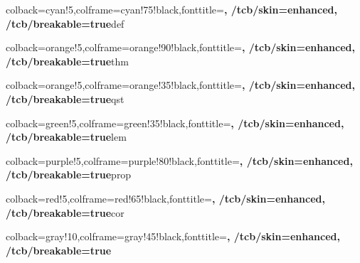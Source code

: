 \usepackage{graphicx}
\graphicspath{{images/}}

\usepackage{float}
\usepackage{titling}
\usepackage{caption}
\usepackage{subcaption}
\usepackage[toc,page]{appendix}
\usepackage[nottoc,notlot,notlof]{tocbibind}
\usepackage{tikz}
\usepackage{cite}



\usepackage{tcolorbox}


\theoremstyle{definition}
\newtheorem{defin}{Definition}[section]
%
{colback=cyan!5,colframe=cyan!75!black,fonttitle=\bfseries, /tcb/skin=enhanced, /tcb/breakable=true}{def}

\newtheorem{theorem}{Theorem}[section]
%
{colback=orange!5,colframe=orange!90!black,fonttitle=\bfseries, /tcb/skin=enhanced, /tcb/breakable=true}{thm}

\newtheorem{quest}{Question}[section]
%
{colback=orange!5,colframe=orange!35!black,fonttitle=\bfseries, /tcb/skin=enhanced, /tcb/breakable=true}{qst}

\newtheorem{lemma}{Lemma}[section]
%
{colback=green!5,colframe=green!35!black,fonttitle=\bfseries, /tcb/skin=enhanced, /tcb/breakable=true}{lem}

\newtheorem{prop}{Proposition}[section]
%
{colback=purple!5,colframe=purple!80!black,fonttitle=\bfseries, /tcb/skin=enhanced, /tcb/breakable=true}{prop}

\newtheorem{corollary}{Corollary}[theorem]
%
{colback=red!5,colframe=red!65!black,fonttitle=\bfseries, /tcb/skin=enhanced, /tcb/breakable=true}{cor}

%
{colback=gray!10,colframe=gray!45!black,fonttitle=\bfseries, /tcb/skin=enhanced, /tcb/breakable=true}{}

\newcommand{\eop}[0]{\hfill\rule{0.7em}{0.7em}}

\usepackage{hyperref} %

